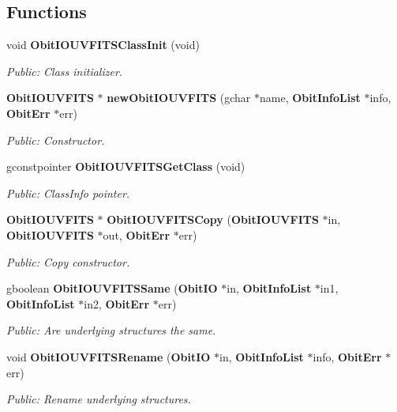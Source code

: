 \subsection*{Functions}
\begin{CompactItemize}
\item 
void {\bf Obit\-IOUVFITSClass\-Init} (void)
\begin{CompactList}\small\item\em Public: Class initializer. \item\end{CompactList}\item 
{\bf Obit\-IOUVFITS} $\ast$ {\bf new\-Obit\-IOUVFITS} (gchar $\ast$name, {\bf Obit\-Info\-List} $\ast$info, {\bf Obit\-Err} $\ast$err)
\begin{CompactList}\small\item\em Public: Constructor. \item\end{CompactList}\item 
gconstpointer {\bf Obit\-IOUVFITSGet\-Class} (void)
\begin{CompactList}\small\item\em Public: Class\-Info pointer. \item\end{CompactList}\item 
{\bf Obit\-IOUVFITS} $\ast$ {\bf Obit\-IOUVFITSCopy} ({\bf Obit\-IOUVFITS} $\ast$in, {\bf Obit\-IOUVFITS} $\ast$out, {\bf Obit\-Err} $\ast$err)
\begin{CompactList}\small\item\em Public: Copy constructor. \item\end{CompactList}\item 
gboolean {\bf Obit\-IOUVFITSSame} ({\bf Obit\-IO} $\ast$in, {\bf Obit\-Info\-List} $\ast$in1, {\bf Obit\-Info\-List} $\ast$in2, {\bf Obit\-Err} $\ast$err)
\begin{CompactList}\small\item\em Public: Are underlying structures the same. \item\end{CompactList}\item 
void {\bf Obit\-IOUVFITSRename} ({\bf Obit\-IO} $\ast$in, {\bf Obit\-Info\-List} $\ast$info, {\bf Obit\-Err} $\ast$err)
\begin{CompactList}\small\item\em Public: Rename underlying structures. \item\end{CompactList}\item 

\end{CompactItemize}
